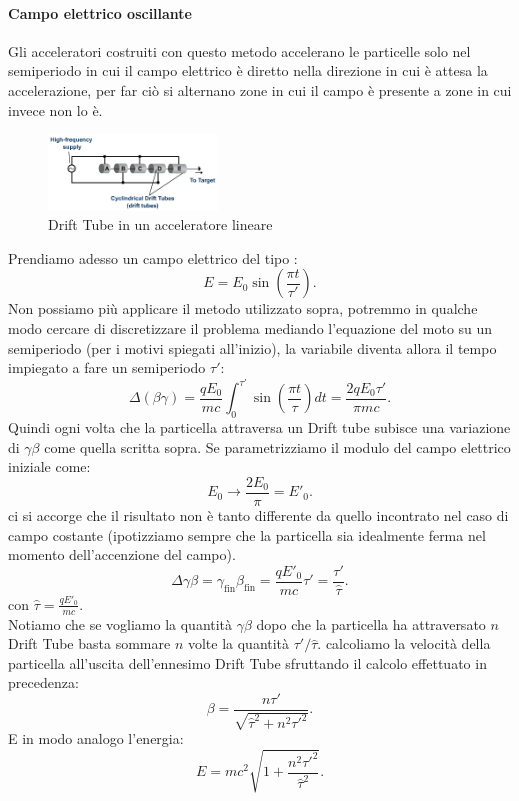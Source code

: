 \paragraph{Campo elettrico oscillante}%
Gli acceleratori costruiti con questo metodo accelerano le particelle solo nel semiperiodo in cui il campo elettrico è diretto nella direzione in cui è attesa la accelerazione, per far ciò si alternano zone in cui il campo è presente a zone in cui invece non lo è.
\begin{figure}[H]
	\centering
	\includegraphics[width=0.4\textwidth]{immagini/drift-tube.png}
	\caption{Drift Tube in un acceleratore lineare}
	\label{fig:Drift Tube}
\end{figure}
Prendiamo adesso un campo elettrico del tipo :
\[
	E= E_0\sin\left( \frac{\pi t}{\tau'} \right) 
.\] 
Non possiamo più applicare il metodo utilizzato sopra, potremmo in qualche modo cercare di discretizzare il problema mediando l'equazione del moto su un semiperiodo (per i motivi spiegati all'inizio), la variabile diventa allora il tempo impiegato a fare un semiperiodo $\tau'$:
\[
	\Delta \left( \beta\gamma \right) = \frac{qE_0}{mc}\int_0^{\tau'} \sin \left( \frac{\pi t}{\tau} \right) dt = \frac{2qE_0\tau'}{\pi mc}
.\] 
Quindi ogni volta che la particella attraversa un Drift tube subisce una variazione di $\gamma\beta$ come quella scritta sopra.
Se parametrizziamo il modulo del campo elettrico iniziale come:
\[
	E_0 \rightarrow \frac{2E_0}{\pi} = E'_0
.\] 
ci si accorge che il risultato non è tanto differente da quello incontrato nel caso di campo costante (ipotizziamo sempre che la particella sia idealmente ferma nel momento dell'accenzione del campo).
\[
	\Delta \gamma\beta = \gamma_{\text{fin}}\beta_{\text{fin}}=\frac{qE'_0}{mc}\tau'=\frac{\tau'}{\hat{\tau}}
.\] 
con $\hat{\tau}=\frac{qE'_0}{mc}$.\\
Notiamo che se vogliamo la quantità $\gamma\beta$ dopo che la particella ha attraversato $n$ Drift Tube basta sommare $n$ volte la quantità $\tau' /\hat{\tau}$.
calcoliamo la velocità della particella all'uscita dell'ennesimo Drift Tube sfruttando il calcolo effettuato in precedenza:
\[
	\beta = \frac{n \tau'}{\sqrt{\hat{\tau}^2 + n^2 \tau'^2} }
.\] 
E in modo analogo l'energia:
\[
	E = mc^2\sqrt{1+\frac{n^2\tau'^2}{\hat{\tau}^2}} 
.\] 
